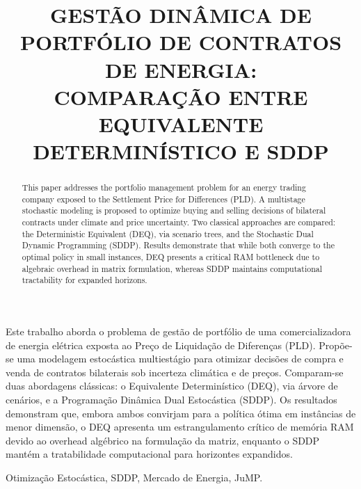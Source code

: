 \documentclass[a4paper,11pt]{article}
\begin{document}
\title{GESTÃO DINÂMICA DE PORTFÓLIO DE CONTRATOS DE ENERGIA: \\ COMPARAÇÃO ENTRE EQUIVALENTE DETERMINÍSTICO E SDDP} 

\maketitle
\thispagestyle{fancy}

\author{
}

\author{ 
}

\author{ 
}

\vspace{8mm}
\begin{resumo}
Este trabalho aborda o problema de gestão de portfólio de uma comercializadora de energia elétrica exposta ao Preço de Liquidação de Diferenças (PLD). Propõe-se uma modelagem estocástica multiestágio para otimizar decisões de compra e venda de contratos bilaterais sob incerteza climática e de preços. Comparam-se duas abordagens clássicas: o Equivalente Determinístico (DEQ), via árvore de cenários, e a Programação Dinâmica Dual Estocástica (SDDP). Os resultados demonstram que, embora ambos convirjam para a política ótima em instâncias de menor dimensão, o DEQ apresenta um estrangulamento crítico de memória RAM devido ao overhead algébrico na formulação da matriz, enquanto o SDDP mantém a tratabilidade computacional para horizontes expandidos.
\end{resumo}

\bigskip
\begin{palchaves}
Otimização Estocástica, SDDP, Mercado de Energia, JuMP.

\bigskip
{}
\end{palchaves}

\vspace{8mm}

\begin{abstract}
This paper addresses the portfolio management problem for an energy trading company exposed to the Settlement Price for Differences (PLD). A multistage stochastic modeling is proposed to optimize buying and selling decisions of bilateral contracts under climate and price uncertainty. Two classical approaches are compared: the Deterministic Equivalent (DEQ), via scenario trees, and the Stochastic Dual Dynamic Programming (SDDP). Results demonstrate that while both converge to the optimal policy in small instances, DEQ presents a critical RAM bottleneck due to algebraic overhead in matrix formulation, whereas SDDP maintains computational tractability for expanded horizons.
\end{abstract}
\end{document}
